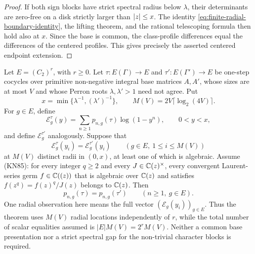 \begin{proof}
If both sign blocks have strict spectral radius below \(\lambda\), their
determinants are zero-free on a disk strictly larger than \(\lvert z \rvert\le x\).
The identity \eqref{eq:finite-radial-boundary-identity}, the lifting theorem,
and the rational telescoping formula then hold also at \(x\).  Since the base
is common, the class-profile differences equal the differences of the centered
profiles.  This gives precisely the asserted centered endpoint extension.
\end{proof}

\begin{theorem}
\label{thm:elementary-two-group-finite-sampling}
Let \(E=(C_2)^r\), with \(r\ge0\).  Let
\(\tau:E(\Gamma)\to E\) and \(\tau':E(\Gamma')\to E\) be one-step
cocycles over primitive non-negative integral base matrices \(A,A'\), whose
sizes are at most \(V\) and whose Perron roots \(\lambda,\lambda'>1\) need
not agree.  Put
\[
 x=\min\{\lambda^{-1},(\lambda')^{-1}\},
 \qquad M(V)=2V\lceil\log_2(4V)\rceil.
\]
For \(g\in E\), define
\[
 \mathcal E_g^\tau(y)=\sum_{n\ge1}p_{n,g}(\tau)\log(1-y^n),
 \qquad 0<y<x,
\]
and define \(\mathcal E_g^{\tau'}\) analogously.  Suppose that
\[
 \mathcal E_g^\tau(y_i)=\mathcal E_g^{\tau'}(y_i)
 \qquad(g\in E,\ 1\le i\le M(V))
\]
at \(M(V)\) distinct radii in \((0,x)\), at least one of which is
algebraic.  Assume \textup{(KN85)}: for every integer \(q\ge2\) and every
\(J\in\mathbb{C}(z)^\times\), every convergent Laurent-series germ
\(f\in\mathbb{C}((z))\) that is algebraic over \(\mathbb{C}(z)\) and satisfies
\(f(z^q)=f(z)^q/J(z)\) belongs to \(\mathbb{C}(z)\).  Then
\[
 p_{n,g}(\tau)=p_{n,g}(\tau')
 \qquad(n\ge1,\ g\in E).
\]
One radial observation here means the full vector
\((\mathcal E_g(y_i))_{g\in E}\).  Thus the theorem uses \(M(V)\)
radial locations independently of \(r\), while the total number of scalar
equalities assumed is \(|E|M(V)=2^rM(V)\).  Neither a common base
presentation nor a strict spectral gap for the non-trivial character blocks
is required.
\end{theorem}

